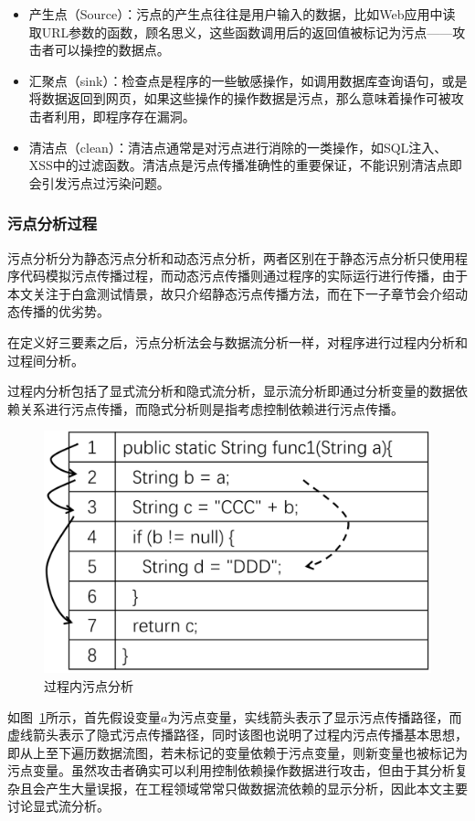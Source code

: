 \begin{itemize}
	\item 产生点（Source）：污点的产生点往往是用户输入的数据，比如Web应用中读取URL参数的函数，顾名思义，这些函数调用后的返回值被标记为污点——攻击者可以操控的数据点。
	\item 汇聚点（sink）：检查点是程序的一些敏感操作，如调用数据库查询语句，或是将数据返回到网页，如果这些操作的操作数据是污点，那么意味着操作可被攻击者利用，即程序存在漏洞。
	\item 清洁点（clean）：清洁点通常是对污点进行消除的一类操作，如SQL注入、XSS中的过滤函数。清洁点是污点传播准确性的重要保证，不能识别清洁点即会引发污点过污染问题。
\end{itemize}


\subsubsection{污点分析过程}         
污点分析分为静态污点分析和动态污点分析，两者区别在于静态污点分析只使用程序代码模拟污点传播过程，而动态污点传播则通过程序的实际运行进行传播，由于本文关注于白盒测试情景，故只介绍静态污点传播方法，而在下一子章节会介绍动态传播的优劣势。

在定义好三要素之后，污点分析法会与数据流分析一样，对程序进行过程内分析和过程间分析。

过程内分析包括了显式流分析和隐式流分析，显示流分析即通过分析变量的数据依赖关系进行污点传播，而隐式分析则是指考虑控制依赖进行污点传播。

\begin{figure}[!htbp]
	\centering
	\includegraphics[width=0.5\linewidth]{FIGs/chapter2/internal_taintflow.png}
	\caption{过程内污点分析}\label{internalflow}
\end{figure}

如图~\ref{internalflow}所示，首先假设变量$a$为污点变量，实线箭头表示了显示污点传播路径，而虚线箭头表示了隐式污点传播路径，同时该图也说明了过程内污点传播基本思想，即从上至下遍历数据流图，若未标记的变量依赖于污点变量，则新变量也被标记为污点变量。虽然攻击者确实可以利用控制依赖操作数据进行攻击，但由于其分析复杂且会产生大量误报，在工程领域常常只做数据流依赖的显示分析，因此本文主要讨论显式流分析。

